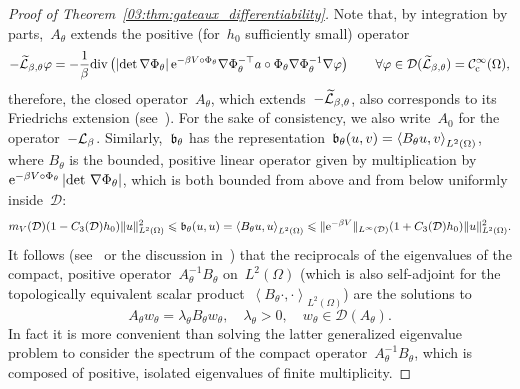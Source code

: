 \begin{proof}[Proof of Theorem~\ref{03:thm:gateaux_differentiability}]
    Note that, by integration by parts,~$A_\theta$ extends the positive (for~$h_0$ sufficiently small) operator
    \begin{equation}
        \label{03:eq:transported_operator}
        -{\widetilde{\mathcal{L}}}_{\beta,\theta} \varphi = -\frac1\beta \mathrm{div}\left(\left|\det \nabla \Phi_\theta\right|\mathrm{e}^{-\beta V\circ \Phi_\theta} \nabla \Phi_\theta^{-\top}a\circ \Phi_\theta \nabla \Phi_\theta^{-1}\nabla \varphi\right)\qquad \forall\varphi\in \mathcal D({\widetilde{\mathcal{L}}}_{\beta,\theta}) = \mathcal {\mathcal{C}^\infty_{\mathrm{c}}}(\Omega),
    \end{equation}
    therefore, the closed operator~$A_\theta$, which extends~$-{\widetilde{\mathcal{L}}}_{\beta,\theta}$, also corresponds to its Friedrichs extension (see~\cite[Section VI.2.3]{K95}).
    For the sake of consistency, we also write~$A_0$ for the operator~$-\mathcal{L}_\beta$. 
    Similarly,~$\mathfrak{b}_\theta$ has the representation~$\mathfrak{b}_\theta(u,v) = \left\langle B_\theta u,v\right\rangle_{L^2(\Omega)}$, where $B_\theta$ is the bounded, positive linear operator given by multiplication by~$\mathrm{e}^{-\beta V\circ \Phi_\theta}\left|\det\,\nabla \Phi_\theta\right|$, which is both bounded from above and from below uniformly inside~$\mathcal D$:
    \begin{equation}
        \label{03:eq:b_bound}
        m_{V}(\mathcal D)(1-C_3(\mathcal D)h_0)\|u\|^2_{L^2(\Omega)}\leqslant \mathfrak{b}_\theta(u,u) = \left\langle B_\theta u,u\right\rangle_{L^2(\Omega)}\leqslant \|\mathrm{e}^{-\beta V}\|_{L^\infty(\mathcal D)}(1+C_3(\mathcal D)h_0)\|u\|^2_{L^2(\Omega)}.
    \end{equation}
    It follows (see~\cite[Proposition 1]{HR80b} or the discussion in~\cite[Section VII.6.1]{K95}) that the reciprocals of the eigenvalues of the compact, positive operator~$A_\theta^{-1}B_\theta$ on~$L^2(\Omega)$ (which is also self-adjoint for the topologically equivalent scalar product~$\left\langle B_\theta\cdot,\cdot\right\rangle_{L^2(\Omega)}$) are the solutions to
    \begin{equation}
        \label{03:eq:eigenvalue_problem_operator_form}
        A_\theta w_\theta = \lambda_\theta B_\theta w_\theta,\quad \lambda_\theta >0,\quad w_\theta \in \mathcal D(A_\theta).
    \end{equation}
    In fact it is more convenient than solving the latter generalized eigenvalue problem to consider the spectrum of the compact operator~$A_\theta^{-1}B_\theta$, which is composed of positive, isolated eigenvalues of finite multiplicity.


\end{proof}
